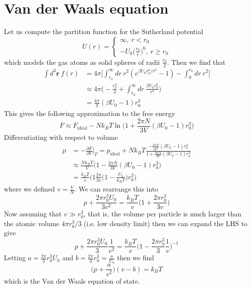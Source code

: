 \documentclass[a4paper,11pt,oneside]{book}
\begin{document}
\section{Van der Waals equation}
Let us compute the partition function for the Sutherland potential
\begin{equation}
    U(r) = \begin{cases}
     \infty, \ r<r_0\\
     -U_0\bigg(\frac{r_0}{r}\bigg)^6, \ r\geq r_0
    \end{cases}
\end{equation}
which models the gas atoms as solid spheres of radii $\frac{r_0}{2}$. Then we find that
\begin{align}
    \int d^3\textbf{r} \ f(r) &= 4\pi \bigg[\int_{r_0}^\infty dr \ r^2  (e^{\beta U_0 r_0^6/r^6}-1)-\int_0^{r_0} dr \ r^2\bigg]\\
    &\approx  4\pi \bigg(-\frac{r_0^3}{3}+\int_{r_0}^\infty dr \  \frac{\beta U_0r_0^6}{r^4}\bigg)\\
    &=\frac{4\pi}{3}(\beta U_0 - 1)r_0^3
\end{align}
This gives the following approximation to the free energy
\begin{equation}
    F \approx F_{\text{ideal}} - Nk_B T \ln\bigg(1+\frac{2\pi N}{3V}(\beta U_0-1)r_0^3\bigg)
\end{equation}
Differentiating with respect to volume
\begin{align}
   p&= -\frac{\partial F}{\partial V}\bigg|_T = p_{\text{ideal}} + Nk_BT \frac{-\frac{2\pi N}{3V^2}(\beta U_0-1)r_0^3}{1+\frac{2\pi N}{3V}(\beta U_0-1)r_0^3}\\
   &\approx\frac{Nk_BT}{V}\bigg(1-\frac{2\pi N}{3V}(\beta U_0-1)r_0^3\bigg)\\
   &=\frac{k_BT}{v}\bigg(1\frac{2\pi}{3v}\Big(1-\frac{U_0}{k_BT}\Big)r_0^3\bigg)
\end{align}
where we defined $v=\frac{V}{N}$. We can rearrange this into
\begin{equation}
    p+\frac{2\pi r_0^3 U_0}{3v^2} = \frac{k_BT}{v}\bigg(1+\frac{2\pi r_0^3}{3v}\bigg)
\end{equation}
Now assuming that $v \gg r_0^3$, that is, the volume per particle is much larger than the atomic volume $4\pi r_0^3/3$ (i.e. low density limit) then we can expand the LHS to give
\begin{equation}
    p + \frac{2\pi r_0^3 U_0}{3}\frac{1}{v^2} = \frac{k_B T}{v}\bigg(1-\frac{2\pi r_0^3}{3}\frac{1}{v}\bigg)^{-1}
\end{equation}
Letting $a=\frac{2\pi}{3} r_0^3 U_0$ and $b=\frac{2\pi}{3}r_0^3 = \frac{a}{U_0}$ then we find
\begin{equation}
    \bigg(p+\frac{a}{v^2}\bigg)(v-b) = k_B T
\end{equation}
which is the Van der Waals equation of state.
\end{document}
